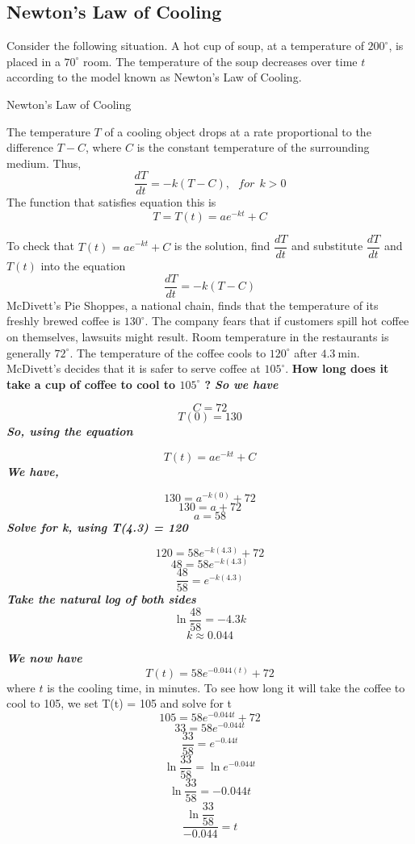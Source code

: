 \documentclass{report}
\begin{document}
\subsection*{Newton's Law of Cooling}
Consider the following situation. A hot cup of soup, at a temperature of $200^{\circ}$, is placed in a $70^{\circ}$ room. The temperature of the soup decreases over time $t$ according to the model known as Newton's Law of Cooling.
\bigbreak \noindent
\begin{mdframed}
  \begin{large}
   Newton's Law of Cooling 
  \end{large}  
  \bigbreak \noindent
  The temperature $T$ of a cooling object drops at a rate proportional to the difference $ T - C$, where $C$ is the constant temperature of the surrounding medium. Thus,
  $$ \dfrac{dT}{dt} = -k(T - C), \ \ \ for \ \ k > 0 $$
  The function that satisfies equation this is 
  $$ T = T(t) = ae^{-kt} + C$$
\end{mdframed}
\bigbreak \noindent
To check that $T(t) = ae^{-kt} + C$ is the solution, find $\dfrac{dT}{dt}$ and substitute $\dfrac{dT}{dt}$ and $T(t)$ into the equation
$$ \dfrac{dT}{dt} = -k(T - C)$$
\bigbreak \noindent
\q
McDivett's Pie Shoppes, a national chain, finds that the temperature of its freshly brewed coffee is $130^{\circ}$. The company fears that if customers spill hot coffee on themselves, lawsuits might result. Room temperature in the restaurants is generally $72^{\circ}$. The temperature of the coffee cools to $120^{\circ}$ after $4.3 \mathrm{~min}$. McDivett's decides that it is safer to serve coffee at $105^{\circ}$. 
\bigbreak \noindent
\textbf{How long does it take a cup of coffee to cool to $105^{\circ}$ ?}
\bigbreak \noindent
\textit{\textbf{So we have}}

$$ C = 72$$
$$ T(0) = 130$$
\textit{\textbf{So, using the equation}}

$$ T(t) = ae^{-kt} + C$$
\textit{\textbf{We have,}}

$$ 130 = a^{-k(0)} + 72$$
$$ 130 = a + 72$$
$$ a = 58$$
\textit{\textbf{Solve for k, using T(4.3) = 120}}

$$120 = 58e^{-k(4.3)} + 72$$
$$48 = 58e^{-k(4.3)}$$
$$ \dfrac{48}{58} = e^{-k(4.3)}$$
\textit{\textbf{Take the natural log of both sides}}
$$ \ln{\dfrac{48}{58}}  = -4.3k$$
$$ k \approx 0.044$$

\pagebreak \noindent
\textit{\textbf{We now have}}
$$ T(t) = 58e^{-0.044(t)} + 72$$
where $t$ is the cooling time, in minutes. To see how long it will take the coffee to cool to 105, we set T(t) = 105 and solve for t
$$ 105 = 58e^{-0.044t} + 72$$
$$ 33 = 58e^{-0.044t}$$
$$ \dfrac{33}{58} = e^{-0.44t}$$
$$ \ln{\dfrac{33}{58}} = \ln{e^{-0.044t}}$$
$$ \ln{\dfrac{33}{58}} = -0.044t$$
$$ \dfrac{\ln{\dfrac{33}{58}}}{-0.044} = t$$
\end{document}
